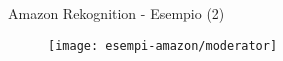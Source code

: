 %
\begin{frame}[t]{Amazon Rekognition - Esempio (2)}
	\begin{figure}[h]
	\centering
	    \texttt{[image: esempi-amazon/moderator]}
		\label{fig:esempio-amazon}
	\end{figure}
\end{frame}
%
